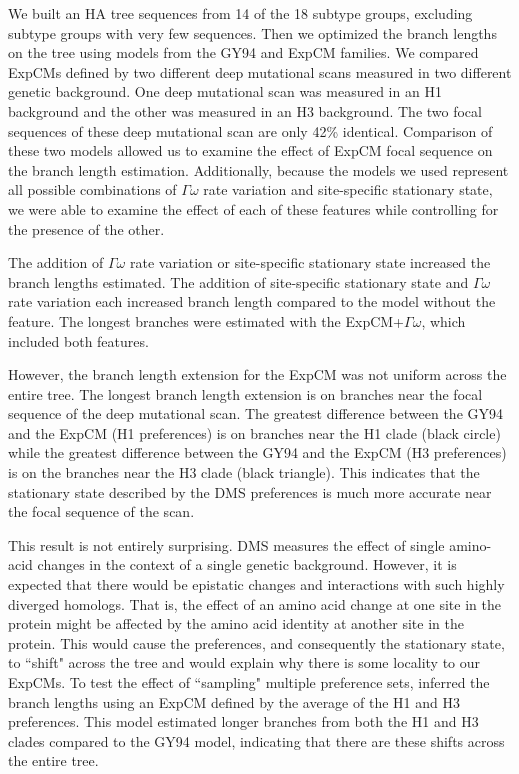 \documentclass[11pt]{article}
\begin{document}
We built an HA tree sequences from 14 of the 18 subtype groups, excluding subtype groups with very few sequences. 
Then we optimized the branch lengths on the tree using models from the GY94 and ExpCM families. 
We compared ExpCMs defined by two different deep mutational scans measured in two different genetic background. 
One deep mutational scan was measured in an H1 background and the other was measured in an H3 background. 
The two focal sequences of these deep mutational scan are only 42\% identical. 
Comparison of these two models allowed us to examine the effect of ExpCM focal sequence on the branch length estimation. 
Additionally, because the models we used represent all possible combinations of $\Gamma\omega$ rate variation and site-specific stationary state, we were able to examine the effect of each of these features while controlling for the presence of the other. 

The addition of $\Gamma\omega$ rate variation or site-specific stationary state increased the branch lengths estimated. 
The addition of site-specific stationary state and $\Gamma\omega$ rate variation each increased branch length compared to the model without the feature. 
The longest branches were estimated with the ExpCM+$\Gamma\omega$, which included both features. 

However, the branch length extension for the ExpCM was not uniform across the entire tree. 
The longest branch length extension is on branches near the focal sequence of the deep mutational scan. 
The greatest difference between the GY94 and the ExpCM (H1 preferences) is on branches near the H1 clade (black circle) while the greatest difference between the GY94 and the ExpCM (H3 preferences) is on the branches near the H3 clade (black triangle). 
This indicates that the stationary state described by the DMS preferences is much more accurate near the focal sequence of the scan. 

This result is not entirely surprising. 
DMS measures the effect of single amino-acid changes in the context of a single genetic background. 
However, it is expected that there would be epistatic changes and interactions with such highly diverged homologs. 
That is, the effect of an amino acid change at one site in the protein might be affected by the amino acid identity at another site in the protein. 
This would cause the preferences, and consequently the stationary state, to ``shift" across the tree and would explain why there is some locality to our ExpCMs. 
To test the effect of ``sampling" multiple preference sets, inferred the branch lengths using an ExpCM defined by the average of the H1 and H3 preferences. 
This model estimated longer branches from both the H1 and H3 clades compared to the GY94 model, indicating that there are these shifts across the entire tree. 
\end{document}

